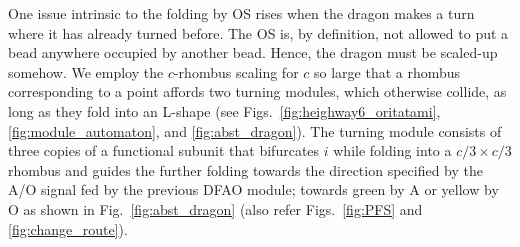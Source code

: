 \documentclass[dvipdfmx,review]{elsarticle}
\begin{document}
One issue intrinsic to the folding by OS rises when the dragon makes a turn where it has already turned before. %
The OS is, by definition, not allowed to put a bead anywhere occupied by another bead. 
Hence, the dragon must be scaled-up somehow. 
We employ the $c$-rhombus scaling for $c$ so large that a rhombus corresponding to a point affords two turning modules, which otherwise collide, as long as they fold into an L-shape (see Figs.~\ref{fig:heighway6_oritatami}, \ref{fig:module_automaton}, and \ref{fig:abst_dragon}). 
The turning module consists of three copies of a functional subunit that bifurcates $i$ while folding into a $c/3 \times c/3$ rhombus and guides the further folding towards the direction specified by the A/O signal fed by the previous DFAO module; towards green by A or yellow by O as shown in Fig.~\ref{fig:abst_dragon} (also refer Figs.~\ref{fig:PFS} and \ref{fig:change_route}). 

\end{document}
